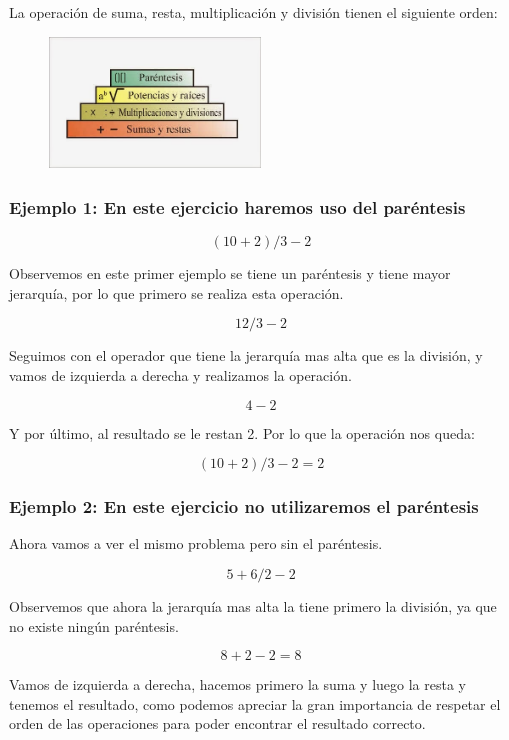 \documentclass[11pt]{book}
\begin{document}
La operación de suma, resta, multiplicación y división tienen el siguiente orden:
\begin{figure}[H]
  \centering
  \includegraphics[width=0.5\textwidth]{./Unidad 2/Images/jerarquia.jpg}
\end{figure}

\subsubsection{Ejemplo 1: En este ejercicio haremos uso del paréntesis}

\[( 10 + 2 ) / 3 - 2\]

Observemos en este primer ejemplo se tiene un paréntesis y tiene mayor jerarquía, por lo que primero se realiza
esta operación.

\[12 / 3 - 2\]

Seguimos con el operador que tiene la jerarquía mas alta que es la división, y vamos de izquierda a derecha y
realizamos la operación.

\[4 - 2\]

Y por último, al resultado se le restan 2. Por lo que la operación nos queda:

\[( 10 + 2 ) / 3 - 2 = 2\]



\subsubsection{Ejemplo 2: En este ejercicio no utilizaremos el paréntesis}


Ahora vamos a ver el mismo problema pero sin el paréntesis.

\[5 + 6 / 2 - 2\]

Observemos que ahora la jerarquía mas alta la tiene primero la división, ya que no existe ningún paréntesis.

\[8 + 2 - 2 = 8\]

Vamos de izquierda a derecha, hacemos primero la suma y luego la resta y tenemos el resultado, como podemos apreciar
la gran importancia de respetar el orden de las operaciones para poder encontrar el resultado correcto.
\end{document}
